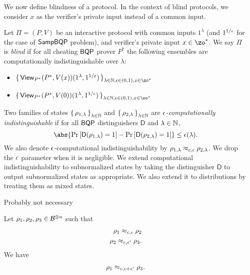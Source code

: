 We now define blindness of a protocol.
In the context of blind protocols, we consider $x$ as the verifier's private input instead of a common input.  

\begin{definition}[Blindness]
	Let $\Pi=(P, V)$ be an interactive protocol with common inputs $1^\lambda$ (and $1^{1/\epsilon}$ for the case of $\operatorname{\mathsf{SampBQP}}$ problem), and verifier's private input $x\in\zo^*$.
	We say $\Pi$ is \emph{blind} if for all cheating $\operatorname{\mathsf{BQP}}$ prover $P^*$ the following ensembles are computationally indistinguishable over $\lambda$:
	\begin{itemize}
		\item $\set{\View_{P^*}(P^*, V(x))(1^\lambda, 1^{1/\eps})}_{\lambda\in\bbN, \eps\in(0,1), x\in\zo^*}$
		\item $\set{\View_{P^*}(P^*, V(0))(1^\lambda, 1^{1/\eps})}_{\lambda\in\bbN, \eps\in(0,1), x\in\zo^*}$
	\end{itemize}
\end{definition}

\begin{definition}
\label{def:comp-indis}
    Two families of states $\set{\rho_{1,\lambda}}_{\lambda\in\mathbb{N}}$ and $\set{\rho_{2,\lambda}}_{\lambda\in\mathbb{N}}$ are \emph{$\epsilon$-computationally indistinguishable} if for all $\operatorname{\mathsf{BQP}}$ distinguishers $\mathsf{D}$ and $\lambda\in\mathbb{N}$,
	$$\abs{\Pr\left[\mathsf{D}(\rho_{1,\lambda})=1\right]-\Pr\left[\mathsf{D}(\rho_{2,\lambda})=1\right]}\leq\eps(\lambda).$$
	We also denote $\epsilon$-computational indistinguishability by $\rho_{1,\lambda}\approx_{c, \epsilon}\rho_{2,\lambda}$.
    We drop the $\epsilon$ parameter when it is negligible.
    We extend computational indistinguishability to subnormalized states by taking the distinguisher $\mathsf{D}$ to output subnormalized states as appropriate.
    We also extend it to distributions by treating them as mixed states.
\end{definition}

\iffalse

Probably not necessary

\begin{lem} \label{lem:computational-triangle0}
    Let $\rho_1, \rho_2, \rho_3\in\mathcal{B}^{\otimes n}$ such that 
    \begin{align}
		\rho_1\approx_{c, \epsilon}\rho_2\\
		\rho_2\approx_{c, \epsilon'}\rho_3.
    \end{align}
    We have 
    \begin{align}
		\rho_1\approx_{c, \epsilon+\epsilon'}\rho_3.
    \end{align}
\end{lem}

